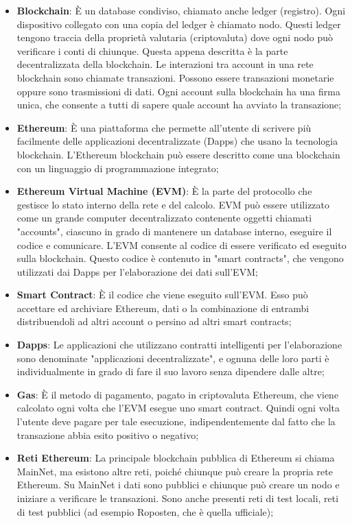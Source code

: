 \begin{itemize}
\item \textbf{Blockchain}: È un database condiviso, chiamato anche ledger (registro). Ogni dispositivo collegato con una copia del ledger è chiamato nodo. Questi ledger tengono traccia della propriet\`a valutaria (criptovaluta) dove ogni nodo pu\`o verificare i conti di chiunque. Questa appena descritta \`e la parte decentralizzata della blockchain. Le interazioni tra account in una rete blockchain sono chiamate transazioni. Possono essere transazioni monetarie oppure sono trasmissioni di dati. Ogni account sulla blockchain ha una firma unica, che consente a tutti di sapere quale account ha avviato la transazione;
\item \textbf{Ethereum}: È una piattaforma che permette all'utente di scrivere pi\`u facilmente delle applicazioni decentralizzate (Dapps) che usano la tecnologia blockchain. L'Ethereum blockchain pu\`o essere descritto come una blockchain con un linguaggio di programmazione integrato;
\item \textbf{Ethereum Virtual Machine (EVM)}: È la parte del protocollo che gestisce lo stato interno della rete e del calcolo. EVM pu\`o essere utilizzato come un grande computer decentralizzato contenente oggetti chiamati "accounts", ciascuno in grado di mantenere un database interno, eseguire il codice e comunicare. L'EVM consente al codice di essere verificato ed eseguito sulla blockchain. Questo codice è contenuto in "smart contracts", che vengono utilizzati dai Dapps per l'elaborazione dei dati sull'EVM;
\item \textbf{Smart Contract}: È il codice che viene eseguito sull'EVM. Esso pu\`o accettare ed archiviare Ethereum, dati o la combinazione di entrambi distribuendoli ad altri account o persino ad altri smart contracts;
\item \textbf{Dapps}: Le applicazioni che utilizzano contratti intelligenti per l'elaborazione sono denominate "applicazioni decentralizzate", e ognuna delle loro parti \`e individualmente in grado di fare il suo lavoro senza dipendere dalle altre;
\item \textbf{Gas}: È il metodo di pagamento, pagato in criptovaluta Ethereum, che viene calcolato ogni volta che l'EVM esegue uno smart contract. Quindi ogni volta l'utente deve pagare per tale esecuzione, indipendentemente dal fatto che la transazione abbia esito positivo o negativo;
\item \textbf{Reti Ethereum}: La principale blockchain pubblica di Ethereum si chiama MainNet, ma esistono altre reti, poiché chiunque può creare la propria rete Ethereum. Su MainNet i dati sono pubblici e chiunque pu\`o creare un nodo e iniziare a verificare le transazioni. Sono anche presenti reti di test locali, reti di test pubblici (ad esempio Roposten, che \`e quella ufficiale);

\end{itemize}
